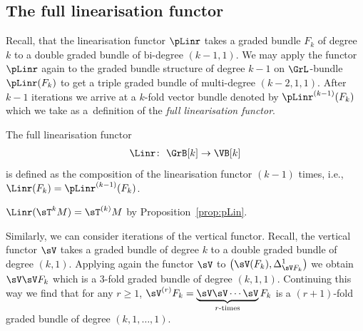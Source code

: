 \subsection{The full linearisation functor}

Recall, that the linearisation functor $\pLinr$ takes a graded bundle $F_k$ of degree $k$ to a double graded bundle of bi-degree $(k-1,1)$. We may apply the functor $\pLinr$ again to the graded bundle structure of degree $k-1$ on $\GrL$-bundle $\pLinr(F_k)$ to get a triple graded bundle of multi-degree $(k-2,1,1)$. After $k-1$ iterations we arrive at a $k$-fold vector bundle denoted by $\pLinr^{(k-1)}(F_k)$ which we take as a~def\/inition of the \emph{full linearisation functor}.
\begin{Definition} \label{def:full_linearisation_functor} The full linearisation functor
\begin{gather*}
\Linr\colon \ \GrB[k] \rightarrow \VB[k]
\end{gather*}
is def\/ined as the composition of the linearisation functor $(k-1)$ times, i.e., $\Linr(F_k) = \pLinr^{(k-1)} (F_k)$.
\end{Definition}

\begin{Example}
$\Linr(\sT^k M) = \sT^{(k)} M$ by Proposition~\ref{prop:pLin}.
\end{Example}

Similarly, we can consider iterations of the vertical functor. Recall, the vertical functor $\sV$ takes a graded bundle of degree $k$ to a double graded bundle of degree $(k, 1)$. Applying again the functor $\sV$ to $\big(\sV(F_k), \Delta^1_{\sV F_k}\big)$ we obtain $\sV \sV F_k$ which is a $3$-fold graded bundle of degree $(k, 1, 1)$. Continuing this way we f\/ind that for any $r\geq 1$, $\sV^{(r)} F_k =
\underbrace{\sV \sV\cdots \sV}_{r\text{-times}} F_k$ is a $(r+1)$-fold graded bundle of degree $(k, 1, \ldots, 1)$.

